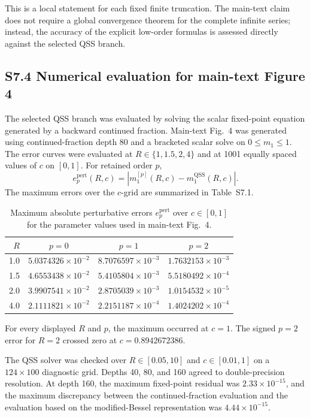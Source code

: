 \documentclass[9pt,a4paper]{article}
\begin{document}
This is a local statement for each fixed finite truncation. The main-text claim does not require a global convergence theorem for the complete infinite series; instead, the accuracy of the explicit low-order formulas is assessed directly against the selected QSS branch.

\subsection*{S7.4 Numerical evaluation for main-text Figure 4}

The selected QSS branch was evaluated by solving the scalar fixed-point equation generated by a backward continued fraction. Main-text Fig.~4 was generated using continued-fraction depth 80 and a bracketed scalar solve on $0\leq m_1\leq1$. The error curves were evaluated at $R\in\{1,1.5,2,4\}$ and at 1001 equally spaced values of $c$ on $[0,1]$. For retained order $p$,
\begin{equation}
e_p^{\mathrm{pert}}(R,c)=\left|m_1^{[p]}(R,c)-m_1^{\mathrm{QSS}}(R,c)\right|.
\end{equation}
The maximum errors over the $c$-grid are summarized in Table~S7.1.

\begin{table}[H]
\centering
\caption{Maximum absolute perturbative errors $e_p^{\mathrm{pert}}$ over $c\in[0,1]$ for the parameter values used in main-text Fig.~4.}
\label{tab:S7-1}
\small
\begin{tabular}{@{}rccc@{}}
\toprule
$R$ & $p=0$ & $p=1$ & $p=2$ \\
\midrule
1.0 & $5.0374326\times10^{-2}$ & $8.7076597\times10^{-3}$ & $1.7632153\times10^{-3}$ \\
1.5 & $4.6553438\times10^{-2}$ & $5.4105804\times10^{-3}$ & $5.5180492\times10^{-4}$ \\
2.0 & $3.9907541\times10^{-2}$ & $2.8705039\times10^{-3}$ & $1.0154532\times10^{-5}$ \\
4.0 & $2.1111821\times10^{-2}$ & $2.2151187\times10^{-4}$ & $1.4024202\times10^{-4}$ \\
\bottomrule
\end{tabular}
\end{table}

For every displayed $R$ and $p$, the maximum occurred at $c=1$. The signed $p=2$ error for $R=2$ crossed zero at $c=0.8942672386$.

The QSS solver was checked over $R\in[0.05,10]$ and $c\in[0.01,1]$ on a $124\times100$ diagnostic grid. Depths 40, 80, and 160 agreed to double-precision resolution. At depth 160, the maximum fixed-point residual was $2.33\times10^{-15}$, and the maximum discrepancy between the continued-fraction evaluation and the evaluation based on the modified-Bessel representation was $4.44\times10^{-15}$.
\end{document}

